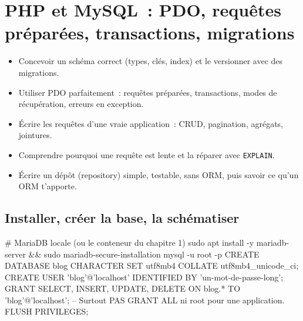 \chapter{PHP et MySQL~: PDO, requ\^etes pr\'epar\'ees, transactions, migrations}
\label{ch-php-db}

\begin{objectif}
\begin{itemize}
  \item Concevoir un sch\'ema correct (types, cl\'es, index) et le versionner avec des migrations.
  \item Utiliser PDO parfaitement~: requ\^etes pr\'epar\'ees, transactions, modes de r\'ecup\'eration,
        erreurs en exception.
  \item \'Ecrire les requ\^etes d'une vraie application~: CRUD, pagination, agr\'egats, jointures.
  \item Comprendre pourquoi une requ\^ete est lente et la r\'eparer avec \verb|EXPLAIN|.
  \item \'Ecrire un d\'ep\^ot (repository) simple, testable, sans ORM, puis savoir ce qu'un ORM t'apporte.
\end{itemize}
\end{objectif}

\section{Installer, cr\'eer la base, la sch\'ematiser}

\begin{terminal}
# MariaDB locale (ou le conteneur du chapitre 1)
sudo apt install -y mariadb-server && sudo mariadb-secure-installation
mysql -u root -p
CREATE DATABASE blog CHARACTER SET utf8mb4 COLLATE utf8mb4_unicode_ci;
CREATE USER 'blog'@'localhost' IDENTIFIED BY 'un-mot-de-passe-long';
GRANT SELECT, INSERT, UPDATE, DELETE ON blog.* TO 'blog'@'localhost';
-- Surtout PAS GRANT ALL ni root pour une application.
FLUSH PRIVILEGES;
\end{terminal}

